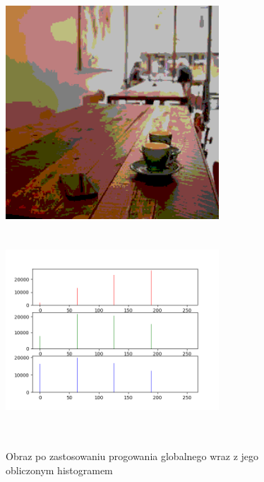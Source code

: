 \documentclass[a4paper,12pt]{book}
\begin{document}
\begin{figure}[H]
	\caption{Obraz po zastosowaniu progowania globalnego wraz z jego obliczonym histogramem}
	\includegraphics[width=8cm, height=8cm]{6-7/multi-global-threshold-image-coffee-4.png}
	\includegraphics[width=8cm, height=8cm]{6-7/multi-global-threshold-coffee-4.png}
\end{figure}
\end{document}
